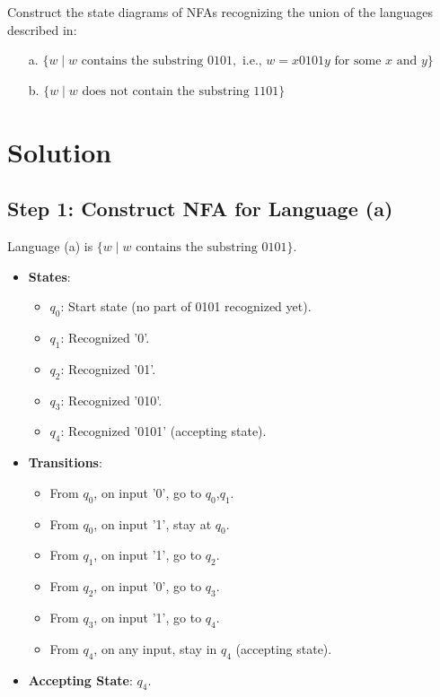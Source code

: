 \documentclass[12pt]{article}
\begin{document}
	\newpage
	\begin{tcolorbox}[
		title=\textbf{Question 4},
		colback=white,
		colframe=transitioncol,
		arc=0mm
		]
		Construct the state diagrams of NFAs recognizing the union of the languages described in:
		\begin{enumerate}
			\item[a.] $\{w \mid w \text{ contains the substring } 0101, \text{ i.e., } w = x0101y \text{ for some } x \text{ and } y\}$
			\item[b.] $\{w \mid w \text{ does not contain the substring } 1101\}$
		\end{enumerate}
	\end{tcolorbox}
	
	\section*{Solution}
	
	\subsection*{Step 1: Construct NFA for Language (a)}
	Language (a) is $\{w \mid w \text{ contains the substring } 0101\}$.
	
	\begin{itemize}
		\item \textbf{States}:
		\begin{itemize}
			\item $q_0$: Start state (no part of 0101 recognized yet).
			\item $q_1$: Recognized '0'.
			\item $q_2$: Recognized '01'.
			\item $q_3$: Recognized '010'.
			\item $q_4$: Recognized '0101' (accepting state).
		\end{itemize}
		
		\item \textbf{Transitions}:
		\begin{itemize}
			\item From $q_0$, on input '0', go to $q_0$,$q_1$.
			\item From $q_0$, on input '1', stay at $q_0$.
			\item From $q_1$, on input '1', go to $q_2$.
			\item From $q_2$, on input '0', go to $q_3$.
			\item From $q_3$, on input '1', go to $q_4$.
			\item From $q_4$, on any input, stay in $q_4$ (accepting state).
		\end{itemize}
		
		\item \textbf{Accepting State}: $q_4$.
	\end{itemize}
	
\end{document}
